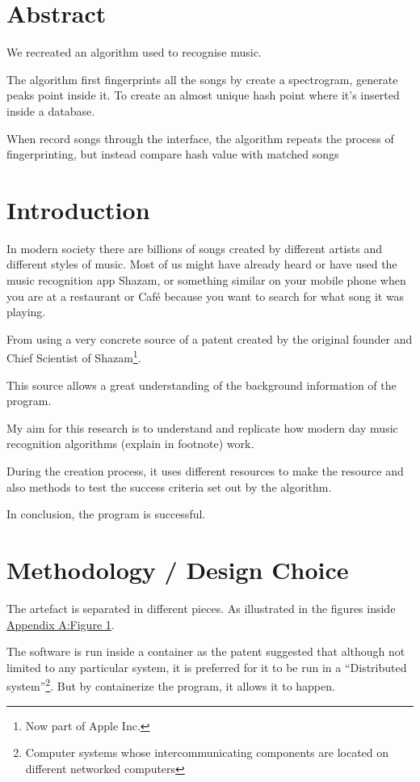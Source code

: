 \chapter*{Abstract}
We recreated an algorithm used to recognise music. 

The algorithm first fingerprints all the songs by create a spectrogram, generate peaks point inside it. To create an almost unique hash point where it's inserted inside a database. 

When record songs through the interface, the algorithm repeats the process of fingerprinting, but instead compare hash value with matched songs
\chapter{Introduction}

In modern society there are billions of songs created by different artists and different styles of music. Most of us might have already heard or have used the music recognition app Shazam\trademark, or something similar on your mobile phone when you are at a restaurant or Café because you want to search for what song it was playing. 

From using a very concrete source of a patent created by the original founder and Chief Scientist of Shazam\trademark \footnote{Now part of Apple Inc\trademark.}\cite{newnham_interview_2023}.

This source allows a great understanding of the background information of the program. 

My aim for this research is to understand and replicate how modern day music recognition algorithms (explain in footnote) work. 

During the creation process, it uses different resources to make the resource and also methods to test the success criteria set out by the algorithm. 

In conclusion, the program is successful.
\chapter{Methodology / Design Choice}
The artefact is separated in different pieces. As illustrated in the figures inside \hyperref[fig:overall_arch]{Appendix A:Figure 1}. 

The software is run inside a container as the patent suggested that although not limited to any particular system, it is preferred for it to be run in a “Distributed system”\footnote{Computer systems whose intercommunicating components are located on different networked computers\cite{noauthor_distributed_2024}}. But by containerize the program, it allows it to happen.

